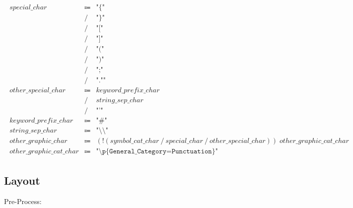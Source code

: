 \begin{align*}
    \begin{array}{rcll}
        \mathit{special\_char}
        &\Coloneq &\texttt{"\{"} \\
        &\mathrel{/} &\texttt{"\}"} \\
        &\mathrel{/} &\texttt{"["} \\
        &\mathrel{/} &\texttt{"]"} \\
        &\mathrel{/} &\texttt{"("} \\
        &\mathrel{/} &\texttt{")"} \\
        &\mathrel{/} &\texttt{";"} \\
        &\mathrel{/} &\texttt{".""} \\
        \mathit{other\_special\_char}
        &\Coloneq &\mathit{keyword\_prefix\_char} \\
        &\mathrel{/} &\mathit{string\_sep\_char} \\
        &\mathrel{/} &\texttt{"'"} \\
        \mathit{keyword\_prefix\_char}
        &\Coloneq &\texttt{"\#"} \\
        \mathit{string\_sep\_char}
        &\Coloneq &\texttt{"\textbackslash \textbackslash "} \\
        \mathit{other\_graphic\_char}
        &\Coloneq &(\mathop{!} (\mathit{symbol\_cat\_char} \mathrel{/} \mathit{special\_char} \mathrel{/} \mathit{other\_special\_char}))\; \mathit{other\_graphic\_cat\_char} \\
        \mathit{other\_graphic\_cat\_char}
        &\Coloneq &\texttt{"\textbackslash p\{General\_Category=Punctuation\}"}
    \end{array}
\end{align*}

\subsection{Layout}

Pre-Process:

